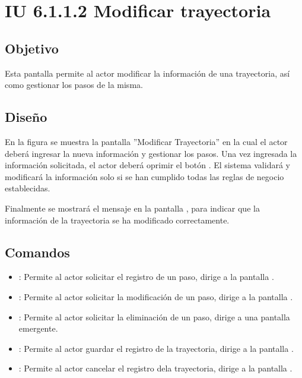 \section{IU 6.1.1.2 Modificar trayectoria}

\subsection{Objetivo}
	Esta pantalla permite al actor modificar la información de una trayectoria, así como gestionar los pasos de la misma.
\subsection{Diseño}
	En la figura  se muestra la pantalla ''Modificar Trayectoria'' en la cual el actor deberá ingresar la nueva información y gestionar los pasos.
	Una vez ingresada la información solicitada, el actor deberá oprimir el botón  . El sistema validará y modificará la información solo si se han cumplido todas las reglas de negocio establecidas.
	
	Finalmente se mostrará el mensaje  en la pantalla , para indicar que la información de la trayectoria se ha modificado correctamente.

\subsection{Comandos}
\begin{itemize}
	\item {}: Permite al actor solicitar el registro de un paso, dirige a la pantalla .
	\item \editar [Modificar]: Permite al actor solicitar la modificación de un paso, dirige a la pantalla .
	\item \eliminar [Eliminar]: Permite al actor solicitar la eliminación de un paso, dirige a una pantalla emergente.
	\item {}: Permite al actor guardar el registro de la trayectoria, dirige a la pantalla .
	\item {}: Permite al actor cancelar el registro dela trayectoria, dirige a la pantalla .
\end{itemize}

